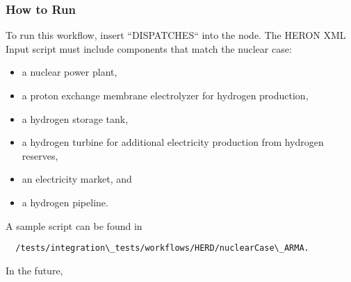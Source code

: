 \subsubsection{How to Run}
To run this workflow, insert “DISPATCHES“ into the  node. The HERON XML Input script must include components that match the nuclear case:
\begin{itemize}
  \item a nuclear power plant,
  \item a proton exchange membrane electrolyzer for hydrogen production,
  \item a hydrogen storage tank,
  \item a hydrogen turbine for additional electricity production from hydrogen reserves,
  \item an electricity market, and
  \item a hydrogen pipeline.
\end{itemize}
A sample script can be found in
\begin{lstlisting}
  /tests/integration\_tests/workflows/HERD/nuclearCase\_ARMA.
\end{lstlisting} 

In the future, 